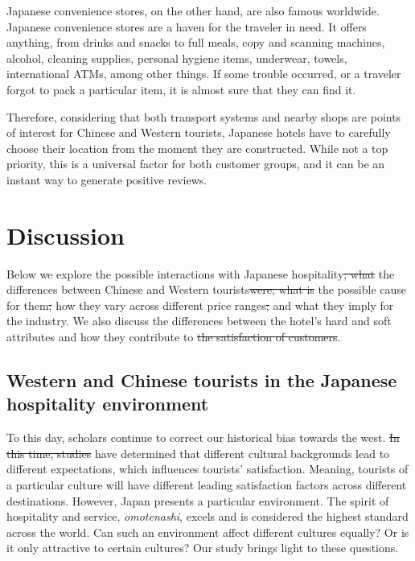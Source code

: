 \documentclass[smallextended,natbib]{svjour3}       %
\providecommand{\DIFadd}[1]{{\protect\color{blue}\uwave{#1}}} %
\providecommand{\DIFdel}[1]{{\protect\color{red}\sout{#1}}}                      %
\providecommand{\DIFaddbegin}{} %
\providecommand{\DIFaddend}{} %
\providecommand{\DIFdelbegin}{} %
\providecommand{\DIFdelend}{} %
\newcommand{\DIFscaledelfig}{0.5}
\newlength{\DIFdelgraphicswidth} %
\newlength{\DIFdelgraphicsheight} %
\newcommand{\DIFaddincludegraphics}[2][]{{\color{blue}\fbox{\DIFOincludegraphics[#1]{#2}}}} %
\newcommand{\DIFdelincludegraphics}[2][]{%
\sbox{\DIFdelgraphicsbox}{\DIFOincludegraphics[#1]{#2}}%
\settoboxwidth{\DIFdelgraphicswidth}{\DIFdelgraphicsbox} %
\settoboxtotalheight{\DIFdelgraphicsheight}{\DIFdelgraphicsbox} %
\scalebox{\DIFscaledelfig}{%
\parbox[b]{\DIFdelgraphicswidth}{\usebox{\DIFdelgraphicsbox}\\[-\baselineskip] \rule{\DIFdelgraphicswidth}{0em}}\llap{\resizebox{\DIFdelgraphicswidth}{\DIFdelgraphicsheight}{%
\setlength{\unitlength}{\DIFdelgraphicswidth}%
\begin{picture}(1,1)%
\thicklines\linethickness{2pt} %
{\color[rgb]{1,0,0}\put(0,0){\framebox(1,1){}}}%
{\color[rgb]{1,0,0}\put(0,0){\line( 1,1){1}}}%
{\color[rgb]{1,0,0}\put(0,1){\line(1,-1){1}}}%
\end{picture}%
}\hspace*{3pt}}} %
} %
\DeclareRobustCommand{\DIFaddbegin}{\DIFOaddbegin \let\includegraphics\DIFaddincludegraphics} %
\DeclareRobustCommand{\DIFaddend}{\DIFOaddend \let\includegraphics\DIFOincludegraphics} %
\DeclareRobustCommand{\DIFdelbegin}{\DIFOdelbegin \let\includegraphics\DIFdelincludegraphics} %
\DeclareRobustCommand{\DIFdelend}{\DIFOaddend \let\includegraphics\DIFOincludegraphics} %
\begin{document}
    Japanese convenience stores, on the other hand, are also famous worldwide. Japanese convenience stores are a haven for the traveler in need. It offers anything, from drinks and snacks to full meals, copy and scanning machines, alcohol, cleaning supplies, personal hygiene items, underwear, towels, international ATMs, among other things. If some trouble occurred, or a traveler forgot to pack a particular item, it is almost sure that they can find it. 

    Therefore, considering that both transport systems and nearby shops are points of interest for Chinese and Western tourists, Japanese hotels have to carefully choose their location from the moment they are constructed. While not a top priority, this is a universal factor for both customer groups, and it can be an instant way to generate positive reviews.

\section{Discussion}\label{discussion}

  Below we explore the possible interactions with Japanese hospitality\DIFdelbegin \DIFdel{; what }\DIFdelend \DIFaddbegin \DIFadd{, }\DIFaddend the differences between Chinese and Western tourists\DIFdelbegin \DIFdel{were; what is }\DIFdelend \DIFaddbegin \DIFadd{, }\DIFaddend the possible cause for them\DIFdelbegin \DIFdel{; }\DIFdelend \DIFaddbegin \DIFadd{, }\DIFaddend how they vary across different price ranges\DIFdelbegin \DIFdel{; }\DIFdelend \DIFaddbegin \DIFadd{, }\DIFaddend and what they imply for the industry. We also discuss the differences between the hotel's hard and soft attributes and how they contribute to \DIFdelbegin \DIFdel{the satisfaction of customers}\DIFdelend \DIFaddbegin \DIFadd{customers' satisfaction}\DIFaddend .

  \subsection{Western and Chinese tourists in the Japanese hospitality environment}\label{disc:omotenashi}

    To this day, scholars continue to correct our historical bias towards the west. \DIFdelbegin \DIFdel{In this time, studies }\DIFdelend \DIFaddbegin \DIFadd{Studies }\DIFaddend have determined that different cultural backgrounds lead to different expectations, which influences tourists' satisfaction. Meaning, tourists of a particular culture will have different leading satisfaction factors across different destinations. However, Japan presents a particular environment. The spirit of hospitality and service, \textit{omotenashi}, excels and is considered the highest standard across the world. Can such an environment affect different cultures equally? Or is it only attractive to certain cultures? Our study brings light to these questions.
\end{document}
